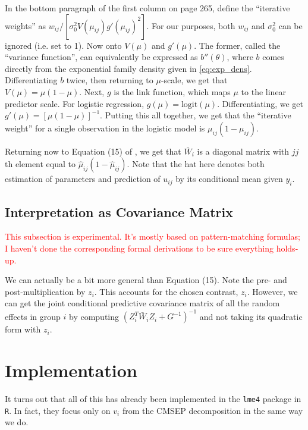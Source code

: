 \documentclass{article}
\newcommand{\logit}{\mathrm{logit}}
\begin{document}
In the bottom paragraph of the first column on page 265, \citeauthor{Boo98} define the ``iterative weights'' as $w_{ij}/ \left[ \sigma_0^2 V(\mu_{ij}) g'(\mu_{ij})^2 \right]$. For our purposes, both $w_{ij}$ and $\sigma_0^2$ can be ignored (i.e. set to 1). Now onto $V(\mu)$ and $g'(\mu)$. The former, called the ``variance function'', can equivalently be expressed as $b''(\theta)$, where $b$ comes directly from the exponential family density given in \eqref{eq:exp_dens}. Differentiating $b$ twice, then returning to $\mu$-scale, we get that $V(\mu) = \mu (1 - \mu)$. Next, $g$ is the link function, which maps $\mu$ to the linear predictor scale. For logistic regression, $g(\mu) = \logit(\mu)$. Differentiating, we get $g'(\mu) = [\mu (1 - \mu)]^{-1}$. Putting this all together, we get that the ``iterative weight'' for a single observation in the logistic model is $\mu_{ij} (1 - \mu_{ij})$.

Returning now to Equation (15) of \citeauthor{Boo98}, we get that $\bar{W}_i$ is a diagonal matrix with $jj$th element equal to $\hat{\mu}_{ij} (1 - \hat{\mu}_{ij})$. Note that the hat here denotes both estimation of parameters and prediction of $u_{ij}$ by its conditional mean given $y_i$. 

\subsection{Interpretation as Covariance Matrix}

\textcolor{red}{This subsection is experimental. It's mostly based on pattern-matching formulas; I haven't done the corresponding formal derivations to be sure everything holds-up.}

We can actually be a bit more general than Equation (15). Note the pre- and post-multiplication by $z_i$. This accounts for the chosen contrast, $z_i$. However, we can get the joint conditional predictive covariance matrix of all the random effects in group $i$ by computing $(Z_i^T \bar{W}_i Z_i + G^{-1})^{-1}$ and not taking its quadratic form with $z_i$.

\section{Implementation}

It turns out that all of this has already been implemented in the \texttt{lme4} package in \texttt{R}. In fact, they focus only on $v_i$ from the CMSEP decomposition in the same way we do.
\end{document}
